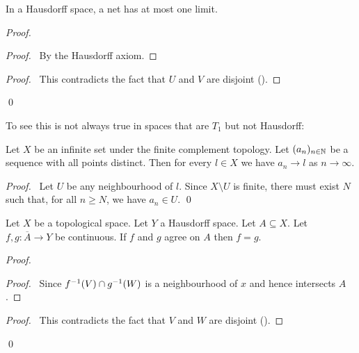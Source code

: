 \begin{theorem}
    In a Hausdorff space, a net has at most one limit.
\end{theorem}

\begin{proof}
    \pf
    \begin{proof}
        \pf\ By the Hausdorff axiom.
    \end{proof}
    \qedstep
    \begin{proof}
        \pf\ This contradicts the fact that $U$ and $V$ are disjoint ().
    \end{proof}
    \qed
\end{proof}

To see this is not always true in spaces that are $T_1$ but not Hausdorff:

\begin{proposition}
    Let $X$ be an infinite set under the finite complement topology. Let $(a_n)_{n \in \mathbb{N}}$ be a sequence
    with all points distinct. Then for every $l \in X$ we have $a_n \rightarrow l$ as
    $n \rightarrow \infty$.
\end{proposition}

\begin{proof}
    \pf\ Let $U$ be any neighbourhood of $l$. Since $X \setminus U$ is finite, there must exist $N$
    such that, for all $n \geq N$, we have $a_n \in U$. \qed
\end{proof}

\begin{proposition}
    Let $X$ be a topological space. Let $Y$ a Hausdorff space. Let $A \subseteq X$. Let $f, g : \overline{A} \rightarrow Y$ be continuous.
    If $f$ and $g$ agree on $A$ then $f = g$.
\end{proposition}

\begin{proof}
    \pf
    \begin{proof}
        \pf\ Since ${f}^{-1}(V) \cap {g}^{-1}(W)$ is a neighbourhood of $x$ and hence intersects $A$.
    \end{proof}
    \qedstep
    \begin{proof}
        \pf\ This contradicts the fact that $V$ and $W$ are disjoint ().
    \end{proof}
    \qed
\end{proof}

